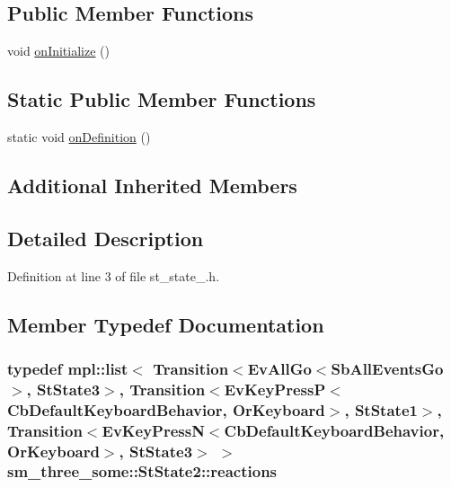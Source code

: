 \subsection*{Public Member Functions}
\begin{DoxyCompactItemize}
\item 
void \hyperlink{structsm__three__some_1_1StState2_a31e1bc14ec72b4fa9dcc6a11d8e77762}{on\+Initialize} ()
\end{DoxyCompactItemize}
\subsection*{Static Public Member Functions}
\begin{DoxyCompactItemize}
\item 
static void \hyperlink{structsm__three__some_1_1StState2_a6fbadc32e16e7c1defafe35a6e1b08da}{on\+Definition} ()
\end{DoxyCompactItemize}
\subsection*{Additional Inherited Members}


\subsection{Detailed Description}


Definition at line 3 of file st\+\_\+state\+\_.\+h.



\subsection{Member Typedef Documentation}
\subsubsection[{\texorpdfstring{reactions}{reactions}}]{\setlength{\rightskip}{0pt plus 5cm}typedef mpl\+::list$<$ Transition$<$Ev\+All\+Go$<$Sb\+All\+Events\+Go$>$, {\bf St\+State3}$>$, Transition$<$Ev\+Key\+PressP$<$Cb\+Default\+Keyboard\+Behavior, {\bf Or\+Keyboard}$>$, {\bf St\+State1}$>$, Transition$<$Ev\+Key\+PressN$<$Cb\+Default\+Keyboard\+Behavior, {\bf Or\+Keyboard}$>$, {\bf St\+State3}$>$ $>$ {\bf sm\+\_\+three\+\_\+some\+::\+St\+State2\+::reactions}}\hypertarget{structsm__three__some_1_1StState2_a701f64421571c548d1295be157bee13a}{}\label{structsm__three__some_1_1StState2_a701f64421571c548d1295be157bee13a}



